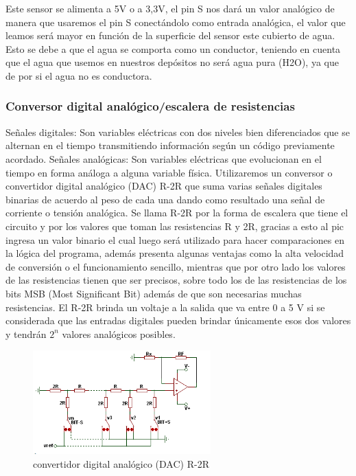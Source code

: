 \documentclass[a4paper]{article}
\begin{document}
Este sensor se alimenta a 5V o a 3,3V, el pin S nos dará un valor 
analógico de manera que usaremos el pin S conectándolo como entrada
 analógica, el valor que leamos será mayor en función de la superficie 
del sensor este cubierto de agua. Esto se debe a que el agua se comporta 
como un conductor, teniendo en cuenta que el agua que usemos en nuestros 
depósitos no será agua pura (H2O), ya que de por si el agua no es 
conductora.

\subsubsection*{Conversor digital analógico/escalera de resistencias}

Señales digitales: Son variables eléctricas con dos niveles bien 
diferenciados que se alternan en el tiempo transmitiendo información
 según un código previamente acordado.
Señales analógicas: Son variables eléctricas que evolucionan en el 
tiempo en forma análoga a alguna variable física.
Utilizaremos un conversor o convertidor digital analógico (DAC) R-2R 
que suma varias señales digitales binarias de acuerdo al peso de cada 
una dando como resultado una señal de corriente o tensión analógica.
 Se llama R-2R por la forma de escalera que tiene el circuito y por 
los valores que toman las resistencias R y 2R, gracias a esto al pic 
ingresa un valor binario el cual luego será utilizado para hacer 
comparaciones en la lógica del programa, además presenta algunas 
ventajas como la alta velocidad de conversión o el funcionamiento 
sencillo, mientras que por otro lado los valores de las resistencias 
tienen que ser precisos, sobre todo los de las resistencias de los
 bits MSB (Most Significant Bit) además de que son necesarias muchas
 resistencias. El R-2R brinda un voltaje a la salida que va entre 0
 a 5 V si se considerada que las entradas digitales pueden brindar 
únicamente esos dos valores y tendrán $2^n$ valores analógicos 
posibles.

\begin{figure}[h]\centering
    \includegraphics[height=4cm]{conversor.png}
    \caption{convertidor digital analógico (DAC) R-2R}
    \label{fig:conversor}
\end{figure}
\end{document}
